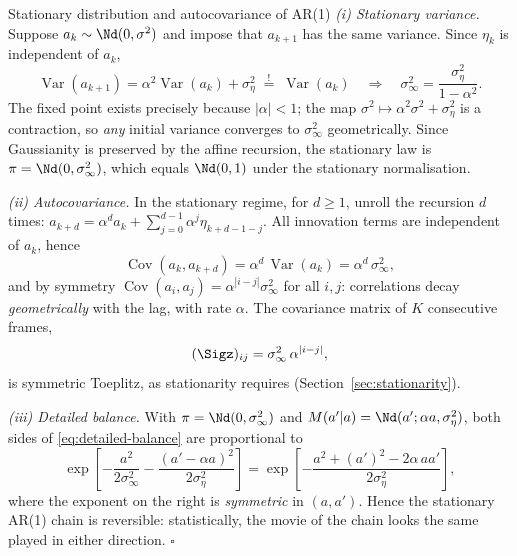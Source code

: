 \begin{toolbox}[tb:ar1]{Stationary distribution and autocovariance of AR(1)}
\emph{(i) Stationary variance.} Suppose $a_k \sim \Nd(0, \sigma^2)$ and
impose that $a_{k+1}$ has the same variance. Since $\eta_k$ is
independent of $a_k$,
\begin{equation*}
  \operatorname{Var}(a_{k+1})
  = \alpha^2 \operatorname{Var}(a_k) + \sigma_\eta^2
  \;\stackrel{!}{=}\; \operatorname{Var}(a_k)
  \quad\Longrightarrow\quad
  \sigma_\infty^2 = \frac{\sigma_\eta^2}{1 - \alpha^2}.
\end{equation*}
The fixed point exists precisely because $|\alpha| < 1$; the map
$\sigma^2 \mapsto \alpha^2 \sigma^2 + \sigma_\eta^2$ is a contraction, so
\emph{any} initial variance converges to $\sigma_\infty^2$ geometrically.
Since Gaussianity is preserved by the affine recursion, the stationary
law is $\pi = \Nd(0, \sigma_\infty^2)$, which equals $\Nd(0,1)$ under the
stationary normalisation.

\emph{(ii) Autocovariance.} In the stationary regime, for $d \geq 1$,
unroll the recursion $d$ times:
$a_{k+d} = \alpha^d a_k + \sum_{j=0}^{d-1} \alpha^{j} \eta_{k+d-1-j}$.
All innovation terms are independent of $a_k$, hence
\begin{equation*}
  \operatorname{Cov}(a_k, a_{k+d})
  = \alpha^d\, \operatorname{Var}(a_k)
  = \alpha^d\, \sigma_\infty^2 ,
\end{equation*}
and by symmetry
$\operatorname{Cov}(a_i, a_j) = \alpha^{|i-j|} \sigma_\infty^2$ for all
$i, j$: correlations decay \emph{geometrically} with the lag, with rate
$\alpha$. The covariance matrix of $K$ consecutive frames,
\begin{equation*}
  (\Sigz)_{ij} = \sigma_\infty^2\, \alpha^{|i-j|},
\end{equation*}
is symmetric Toeplitz, as stationarity requires
(Section~\ref{sec:stationarity}).

\emph{(iii) Detailed balance.} With $\pi = \Nd(0, \sigma_\infty^2)$ and
$M(a'|a) = \Nd(a'; \alpha a, \sigma_\eta^2)$, both sides of
\eqref{eq:detailed-balance} are proportional to
\begin{equation*}
  \exp\!\left[
    -\frac{a^2}{2\sigma_\infty^2}
    -\frac{(a' - \alpha a)^2}{2\sigma_\eta^2}
  \right]
  = \exp\!\left[
    -\frac{a^2 + (a')^2 - 2\alpha\, a a'}{2\sigma_\eta^2}
  \right],
\end{equation*}
where the exponent on the right is \emph{symmetric} in $(a, a')$. Hence
the stationary AR(1) chain is reversible: statistically, the movie of the
chain looks the same played in either direction. \hfill$\square$
\end{toolbox}

